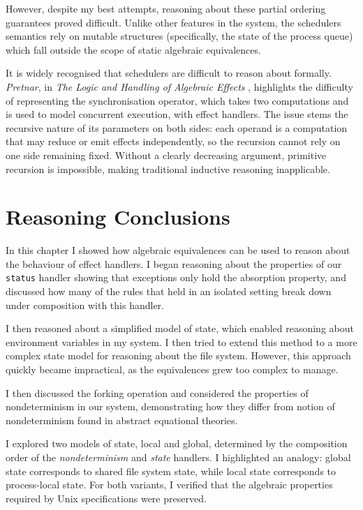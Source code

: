 \documentclass[logo,bsc,singlespacing,parskip]{infthesis}
\begin{document}
However, despite my best attempts, reasoning about these partial ordering guarantees proved difficult. Unlike other features in the system, the schedulers semantics rely on mutable structures (specifically, the state of the process queue) which fall outside the scope of static algebraic equivalences.

It is widely recognised that schedulers are difficult to reason about formally. \textit{Pretnar}, in \textit{The Logic and Handling of Algebraic Effects} \cite{}, highlights the difficulty of representing the synchronisation operator, which takes two computations and is used to model concurrent execution, with effect handlers. The issue stems the recursive nature of its parameters on both sides: each operand is a computation that may reduce or emit effects independently, so the recursion cannot rely on one side remaining fixed. Without a clearly decreasing argument, primitive recursion is impossible, making traditional inductive reasoning inapplicable.

\section{Reasoning Conclusions}
\label{reasoning-conclusion}
In this chapter I showed how algebraic equivalences can be used to reason about the behaviour of effect handlers. I began reasoning about the properties of our \lstinline{status} handler showing that exceptions only hold the absorption property, and discussed how many of the rules that held in an isolated setting break down under composition with this handler. 

I then reasoned about a simplified model of state, which enabled reasoning about environment variables in my system. I then tried to extend this method to a more complex state model for reasoning about the file system. However, this approach quickly became impractical, as the equivalences grew too complex to manage.


I then discussed the forking operation and considered the properties of nondeterminism in our system, demonstrating how they differ from notion of nondeterminism found in abstract equational theories.

I explored two models of state, local and global, determined by the composition order of the \textit{nondeterminism} and \textit{state} handlers. I highlighted an analogy: global state corresponds to shared file system state, while local state corresponds to process-local state. For both variants, I verified that the algebraic properties required by Unix specifications were preserved.
\end{document}

